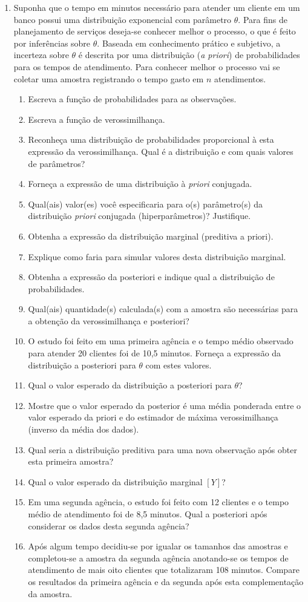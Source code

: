 \documentclass[11pt,a4]{article}\usepackage[]{graphicx}\usepackage[]{xcolor}
\begin{document}
\begin{enumerate}
\item Suponha que o tempo em minutos necessário para atender um cliente em um banco possui uma distribuição exponencial com parâmetro $\theta$.
  Para fins de planejamento de serviços deseja-se conhecer melhor o processo, o que é feito por  inferências sobre $\theta$.
  Baseada em conhecimento prático e subjetivo, a incerteza sobre $\theta$ é descrita por uma distribuição (\textit{a priori}) de probabilidades para os tempos de atendimento.
  Para conhecer melhor o processo vai se coletar uma amostra registrando o tempo gasto em $n$ atendimentos.
  \begin{enumerate}
  \item Escreva a função de probabilidades para as observações.
  \item Escreva a função de verossimilhança. 
  \item Reconheça uma distribuição de probabilidades proporcional à esta expressão da verossimilhança. Qual é a distribuição e com quais valores de parâmetros? 
  \item Forneça a expressão de uma distribuição à {\it priori} conjugada.
  \item Qual(ais) valor(es) você especificaria para o(s) parâmetro(s) da distribuição {\it priori} conjugada (hiperparâmetros)? Justifique.
  \item Obtenha a expressão da distribuição marginal (preditiva a priori).
  \item Explique como faria para simular valores desta distribuição marginal.
  \item Obtenha a expressão da posteriori e indique qual a distribuição de probabilidades.
  \item Qual(ais) quantidade(s) calculada(s) com a amostra são necessárias para a obtenção da verossimilhança e posteriori?
  \item O estudo foi feito em uma primeira agência e o tempo médio observado para atender 20 clientes foi de 10,5 minutos. Forneça a expressão da distribuição a posteriori para $\theta$ com estes valores.
  \item Qual o valor esperado da distribuição a posteriori para $\theta$?
  \item Mostre que o valor esperado da posterior é uma média ponderada entre o valor esperado da priori e do estimador de máxima verossimilhança (inverso da média dos dados). 
  \item Qual seria a distribuição preditiva para uma nova observação após obter esta primeira amostra?
  \item Qual o valor esperado da distribuição marginal $[Y]$?
  \item Em uma segunda agência, o estudo foi feito com 12 clientes e o tempo médio de atendimento foi de 8,5 minutos. Qual a posteriori após considerar os dados desta segunda agência?
  \item Após algum tempo decidiu-se por igualar os tamanhos das amostras e completou-se a amostra da segunda agência anotando-se os tempos de atendimento de mais oito clientes que totalizaram 108 minutos. Compare os resultados da primeira agência e da segunda após esta complementação da amostra.
  \end{enumerate}


\end{enumerate}
\end{document}
